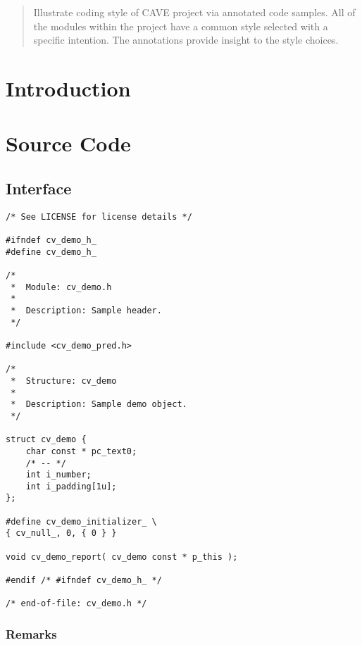 \documentclass[12pt]{article}
\begin{document}
\maketitle
\begin{abstract}

Illustrate coding style of CAVE project via annotated code samples.  All of
the modules within the project have a common style selected with a specific
intention.  The annotations provide insight to the style choices.

\end{abstract}

\section{Introduction}

\section{Source Code}

\subsection{Interface}

\begin{lstlisting}[caption={cv\_demo.h}]
/* See LICENSE for license details */

#ifndef cv_demo_h_
#define cv_demo_h_

/*
 *  Module: cv_demo.h
 *
 *  Description: Sample header.
 */

#include <cv_demo_pred.h>

/*
 *  Structure: cv_demo
 *
 *  Description: Sample demo object.
 */

struct cv_demo {
    char const * pc_text0;
    /* -- */
    int i_number;
    int i_padding[1u];
};

#define cv_demo_initializer_ \
{ cv_null_, 0, { 0 } }

void cv_demo_report( cv_demo const * p_this );

#endif /* #ifndef cv_demo_h_ */

/* end-of-file: cv_demo.h */
\end{lstlisting}

\subsubsection{Remarks}
\end{document}
